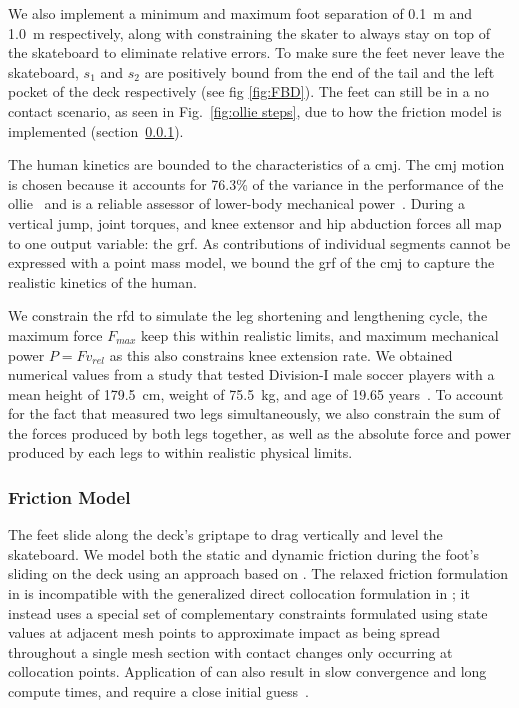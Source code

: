 \documentclass[default,iicol]{sn-jnl}
\begin{document}
We also implement a minimum and maximum foot separation of \SI{0.1}{\meter} and \SI{1.0}{\meter} respectively, along with constraining the skater to always stay on top of the skateboard to eliminate relative errors.
To make sure the feet never leave the skateboard, $s_1$ and $s_2$ are positively bound from the end of the tail and the left pocket of the deck respectively (see fig \ref{fig:FBD}).
The feet can still be in a no contact scenario, as seen in Fig.~\ref{fig:ollie steps}, due to how the friction model is implemented (section~\ref{ss_friction}).

The human kinetics are bounded to the characteristics of a \gls{cmj}.
The \gls{cmj} motion is chosen because it accounts for 76.3\% of the variance in the performance of the ollie~\cite{candotti_lower_2012} and is a reliable assessor of lower-body mechanical power~\cite{barker_relationships_2018}.
During a vertical jump, joint torques, and knee extensor and hip abduction forces all map to one output variable: the \gls{grf}.
As contributions of individual segments cannot be expressed with a point mass model, we bound the \gls{grf} of the \gls{cmj} to capture the realistic kinetics of the human.

We constrain the \gls{rfd} to simulate the leg shortening and lengthening cycle, the maximum force $F_{max}$ keep this within realistic limits, and maximum mechanical power $P = F v_{rel}$ as this also constrains knee extension rate. We obtained numerical values from a study that tested Division-I male soccer players with a mean height of \SI{179.5}{\centi\meter}, weight of \SI{75.5}{\kilo\gram}, and age of 19.65 years~\cite{barker_relationships_2018}. To account for the fact that \citet{barker_relationships_2018} measured two legs simultaneously, we also constrain the sum of the forces produced by both legs together, as well as the absolute force and power produced by each legs to within realistic physical limits.

\subsubsection{Friction Model} \label{ss_friction}
The feet slide along the deck's griptape to drag vertically and level the skateboard. We model both the static and dynamic friction during the foot's sliding on the deck using an approach based on \cite{patel_contact-implicit_2019}.
The relaxed friction formulation in \citet{patel_contact-implicit_2019} is incompatible with the generalized direct collocation formulation in \citet{betts_practical_2010}; it instead uses a special set of complementary constraints formulated using state values at adjacent mesh points to approximate impact as being spread throughout a single mesh section with contact changes only occurring at collocation points.
Application of \cite{patel_contact-implicit_2019} can also result in slow convergence and long compute times, and require a close initial guess~\cite{shield_contact-implicit_2022}.
\end{document}
